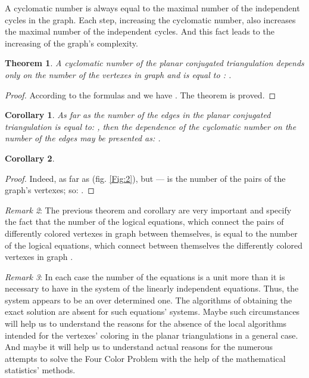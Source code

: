 \documentclass{amsart}
\newtheorem{theorem}{Theorem}
\theoremstyle{plain}
\newtheorem{corollary}{Corollary}
\numberwithin{equation}{section}
\begin{document}
A cyclomatic number is always equal to the maximal number of the independent cycles in the graph. Each step, increasing the cyclomatic number, also increases the maximal number of the independent cycles. And this fact leads to the increasing of the graph's complexity.

\begin{theorem}
A cyclomatic number of the planar conjugated triangulation  depends only on the number of the vertexes  in graph  and is equal to : .
\end {theorem}

\begin {proof}
According to the formulas  and  we have . The theorem is proved.
\end {proof}

\begin{corollary}
As far as the number of the edges  in the planar conjugated triangulation  is equal to: , then the dependence of the cyclomatic number on the number of the edges may be presented as: .
\end {corollary}

\begin{corollary}

\end{corollary}

\begin{proof} 
Indeed, as far as  (fig. \ref{Fig:2}), but  --- is the number of the pairs of the graph's  vertexes; so: .
\end{proof}

\textit{Remark 2}: The previous theorem and corollary are very important and specify the fact that the number of the logical equations, which connect the pairs of differently colored vertexes in graph  between themselves, is equal to the number of the logical equations, which connect between themselves the differently colored vertexes in graph .

\textit{Remark 3}: In each case the number of the equations is a unit more than it is necessary to have in the system of the linearly independent equations. Thus, the system appears to be an over determined one. The algorithms of obtaining the exact solution are absent for such equations' systems. Maybe such circumstances will help us to understand the reasons for the absence of the local algorithms intended for the vertexes' coloring in the planar triangulations in a general case. And maybe it will help us to understand actual reasons for the numerous attempts to solve the Four Color Problem with the help of the mathematical statistics' methods.
\end{document}
